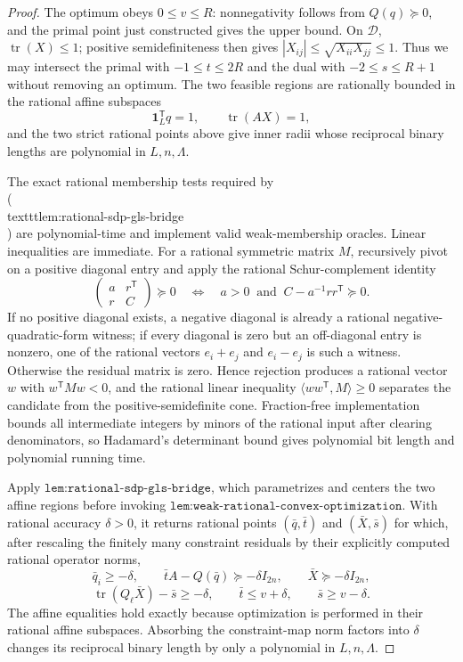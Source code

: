 \documentclass{article}
\begin{document}
\begin{proof}
The optimum obeys \(0\le v\le R\): nonnegativity follows from \(Q(q)\succeq0\), and the primal point just constructed gives the upper bound.  On \(\mathcal D\), \(\operatorname{tr}(X)\le1\); positive semidefiniteness then gives \(|X_{ij}|\le\sqrt{X_{ii}X_{jj}}\le1\).  Thus we may intersect the primal with \(-1\le t\le2R\) and the dual with \(-2\le s\le R+1\) without removing an optimum.  The two feasible regions are rationally bounded in the rational affine subspaces
\[
 \mathbf 1_L^{\mathsf T}q=1,
 \qquad
 \operatorname{tr}(AX)=1,
\]
and the two strict rational points above give inner radii whose reciprocal binary lengths are polynomial in \(L,n,\Lambda\).

The exact rational membership tests required by \\(\\texttt{lem:rational-sdp-gls-bridge}\\) are polynomial-time and implement valid weak-membership oracles.  Linear inequalities are immediate.  For a rational symmetric matrix \(M\), recursively pivot on a positive diagonal entry and apply the rational Schur-complement identity
\[
 \begin{pmatrix}a&r^{\mathsf T}\\r&C\end{pmatrix}\succeq0
 \quad\Longleftrightarrow\quad
 a>0\ \text{ and }\ C-a^{-1}rr^{\mathsf T}\succeq0.
\]
If no positive diagonal exists, a negative diagonal is already a rational negative-quadratic-form witness; if every diagonal is zero but an off-diagonal entry is nonzero, one of the rational vectors \(e_i+e_j\) and \(e_i-e_j\) is such a witness.  Otherwise the residual matrix is zero.  Hence rejection produces a rational vector \(w\) with \(w^{\mathsf T}Mw<0\), and the rational linear inequality \(\langle ww^{\mathsf T},M\rangle\ge0\) separates the candidate from the positive-semidefinite cone.  Fraction-free implementation bounds all intermediate integers by minors of the rational input after clearing denominators, so Hadamard's determinant bound gives polynomial bit length and polynomial running time.

Apply \(\texttt{lem:rational-sdp-gls-bridge}\), which parametrizes and centers the two affine regions before invoking \(\texttt{lem:weak-rational-convex-optimization}\).  With rational accuracy \(\delta>0\), it returns rational points \((\bar q,\bar t)\) and \((\bar X,\bar s)\) for which, after rescaling the finitely many constraint residuals by their explicitly computed rational operator norms,
\[
 \bar q_i\ge-\delta,
 \qquad
 \bar tA-Q(\bar q)\succeq-\delta I_{2n},
 \qquad
 \bar X\succeq-\delta I_{2n},
\]
\[
 \operatorname{tr}(Q_\ell\bar X)-\bar s\ge-\delta,
 \qquad
 \bar t\le v+\delta,
 \qquad
 \bar s\ge v-\delta.
\]
The affine equalities hold exactly because optimization is performed in their rational affine subspaces.  Absorbing the constraint-map norm factors into \(\delta\) changes its reciprocal binary length by only a polynomial in \(L,n,\Lambda\).


\end{proof}
\end{document}
